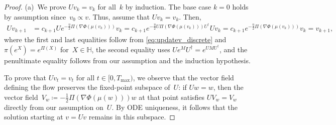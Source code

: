 \documentclass[11pt,letterpaper]{article}
\numberwithin{equation}{section}
\newcommand{\bbH}{\mathbb{H}}
\begin{document}
\begin{proof}
(a)~We prove $U v_k=v_k$ for all~$k$ by induction.
The base case $k=0$ holds by assumption since~$v_0\propto v$.
Thus, assume that $Uv_k=v_k$.
Then,
\begin{align*}
    Uv_{k+1}
&= c_{k+1} U e^{-\frac{\eta}2\Pi(\nabla\Phi(\mu(v_k)))} v_k
= c_{k+1} e^{-\frac{\eta}2U \Pi(\nabla\Phi(\mu(v_k))) U^\dagger} U v_k
= c_{k+1} e^{-\frac{\eta}2 \Pi(\nabla\Phi(\mu(v_k)))} v_k
= v_{k+1},
\end{align*}
where the first and last equalities follow from \cref{eq:updatev_discrete} and~$\pi(e^X) = e^{\Pi(X)}$ for~$X\in\bbH$, the second equality uses $U e^M U^\dagger = e^{U M U^\dagger}$, and the penultimate equality follows from our assumption  and the induction hypothesis.

To prove that $U v_t = v_t$ for all $t\in[0,T_{\max})$, we observe that the vector field defining the flow preserves the fixed-point subspace of~$U$:
if $Uw=w$, then the vector field~$V_w \coloneqq -\frac12\Pi(\nabla\Phi(\mu(w))) w$ at that point satisfies $U V_w = V_w$ directly from our assumption on~$U$.
By ODE uniqueness, it follows that the solution starting at $v = Uv$ remains in this subspace.


\end{proof}
\end{document}
